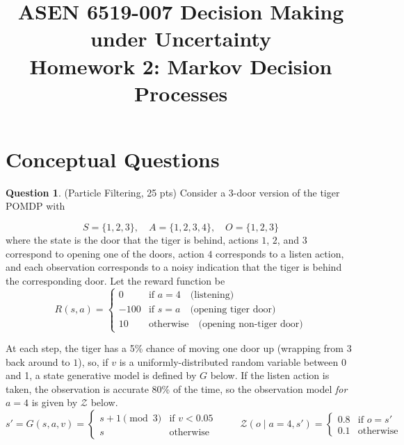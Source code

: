 \documentclass{article}
\title{ASEN 6519-007 Decision Making under Uncertainty\\
       Homework 2: Markov Decision Processes}
\theoremstyle{definition}
\newtheorem{question}[thm]{Question}
\begin{document}
\maketitle

\section{Conceptual Questions}

\begin{question}
    (Particle Filtering, 25 pts) Consider a 3-door version of the tiger POMDP with

\begin{equation*}
S = \{1,2,3\},\quad A = \{1,2,3,4\},\quad O = \{1,2,3\}
\end{equation*}
where the state is the door that the tiger is behind, actions $1$, $2$, and $3$ correspond to opening one of the doors, action $4$ corresponds to a listen action, and each observation corresponds to a noisy indication that the tiger is behind the corresponding door.
Let the reward function be
\begin{equation*}
R(s, a) = \begin{cases}
    0    & \text{if } a = 4 \quad \text{(listening)}\\
    -100 & \text{if } s = a \quad \text{(opening tiger door)}\\
    10   & \text{otherwise} \quad \text{(opening non-tiger door)}
\end{cases}
\end{equation*}

At each step, the tiger has a 5\% chance of moving one door up (wrapping from $3$ back around to $1$), so, if $v$ is a uniformly-distributed random variable between 0 and 1, a state generative model is defined by $G$ below. If the listen action is taken, the observation is accurate 80\% of the time, so the observation model \emph{for $a=4$} is given by $\mathcal{Z}$ below.
\begin{equation} \label{eq:model}
    s' = G(s, a, v) = \begin{cases}
        s+1 \pmod 3 & \text{if } v < 0.05 \\
        s & \text{otherwise}
    \end{cases} \hspace{1cm}
    \mathcal{Z}(o \mid a=4, s') = \begin{cases}
        0.8 & \text{if } o = s' \\
        0.1 & \text{otherwise}
    \end{cases}
\end{equation}


\end{question}
\end{document}

